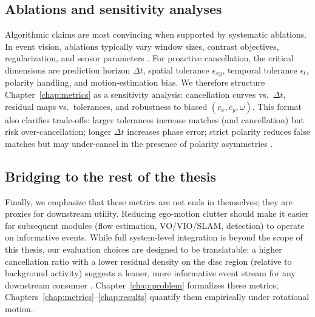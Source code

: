 \subsection{Ablations and sensitivity analyses}
Algorithmic claims are most convincing when supported by systematic ablations. In event vision, ablations typically vary window sizes, contrast objectives, regularization, and sensor parameters \cite{Gallego2018CMax,Rebecq2017}. For proactive cancellation, the critical dimensions are prediction horizon $\Delta t$, spatial tolerance $\epsilon_{xy}$, temporal tolerance $\epsilon_t$, polarity handling, and motion-estimation bias. We therefore structure Chapter~\ref{chap:metrics} as a sensitivity analysis: cancellation curves vs.\ $\Delta t$, residual maps vs.\ tolerances, and robustness to biased $(c_x,c_y,\omega)$. This format also clarifies trade-offs: larger tolerances increase matches (and cancellation) but risk over-cancellation; longer $\Delta t$ increases phase error; strict polarity reduces false matches but may under-cancel in the presence of polarity asymmetries \cite{Gallego2020Survey,Delbruck2020}.

\subsection{Bridging to the rest of the thesis}
Finally, we emphasize that these metrics are not ends in themselves; they are proxies for downstream utility. Reducing ego-motion clutter should make it easier for subsequent modules (flow estimation, VO/VIO/SLAM, detection) to operate on informative events. While full system-level integration is beyond the scope of this thesis, our evaluation choices are designed to be translatable: a higher cancellation ratio with a lower residual density on the disc region (relative to background activity) suggests a leaner, more informative event stream for any downstream consumer \cite{Gallego2020Survey}. Chapter~\ref{chap:problem} formalizes these metrics; Chapters~\ref{chap:metrics}–\ref{chap:results} quantify them empirically under rotational motion.

